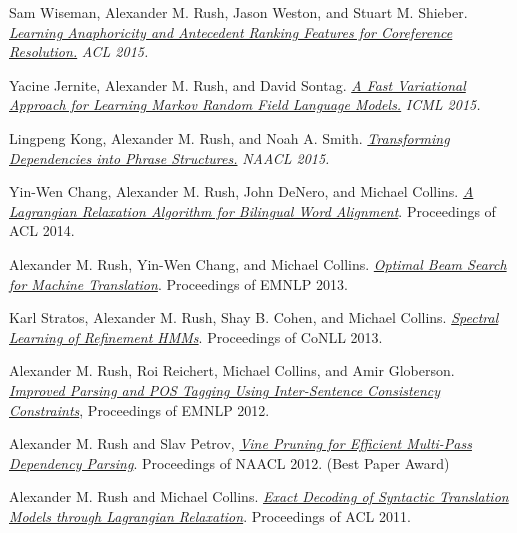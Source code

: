 \documentclass[10pt]{article}
\begin{document}
\medskip


\ind Sam Wiseman, Alexander M. Rush, Jason Weston, and Stuart M. Shieber. \emph{\href{ http://people.seas.harvard.edu/~srush/acl15.pdf }{ Learning Anaphoricity and Antecedent Ranking Features for Coreference Resolution.} }\emph{ ACL 2015. }

\medskip


\ind Yacine Jernite, Alexander M. Rush, and David Sontag. \emph{\href{ http://people.seas.harvard.edu/~srush/icml15.pdf }{ A Fast Variational Approach for Learning Markov Random Field Language Models.} }\emph{ ICML 2015. }

\medskip


\ind Lingpeng Kong, Alexander M. Rush, and Noah A. Smith. \emph{\href{ http://people.seas.harvard.edu/~srush/naacl15.pdf }{ Transforming Dependencies into Phrase Structures.} }\emph{ NAACL 2015. }

\medskip




\ind Yin-Wen Chang, Alexander M. Rush, John DeNero, and Michael Collins.
\emph{\href{http://people.csail.mit.edu/srush/}{A Lagrangian Relaxation Algorithm for Bilingual Word Alignment}}.
Proceedings of ACL 2014.

\medskip

\ind Alexander M. Rush, Yin-Wen Chang, and Michael Collins.
\emph{\href{http://people.csail.mit.edu/srush/}{Optimal Beam Search for Machine Translation}}.
Proceedings of EMNLP 2013.

\medskip

\ind Karl Stratos, Alexander M. Rush, Shay B. Cohen, and Michael Collins.
\emph{\href{http://www.cs.columbia.edu/~stratos/research/conll13rhmm.pdf}{Spectral Learning of Refinement HMMs}}.
Proceedings of CoNLL 2013.

\medskip

\ind Alexander M. Rush, Roi Reichert, Michael Collins, and Amir Globerson.
\emph{\href{http://people.csail.mit.edu/srush/emnlp2012.pdf.pdf}{Improved Parsing and POS Tagging Using Inter-Sentence Consistency Constraints}},
Proceedings of EMNLP 2012.

\medskip

\ind Alexander M. Rush and Slav Petrov, \emph{\href{http://people.csail.mit.edu/srush/vine-paper.pdf}{Vine Pruning for Efficient Multi-Pass Dependency Parsing}}. Proceedings of NAACL 2012. (Best Paper Award)


\medskip

\ind Alexander M. Rush and Michael Collins. \emph{\href{http://people.csail.mit.edu/srush/exdecmt.pdf}{Exact Decoding of Syntactic Translation Models through Lagrangian Relaxation}}. Proceedings of ACL 2011.
\end{document}

